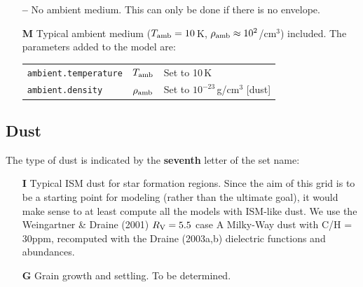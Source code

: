 \documentclass[10pt]{article}
\begin{document}
\begin{itemize}

\item[\textbf{--}] No ambient medium. This can only be done if there is no envelope.

\item[\textbf{M}] Typical ambient medium ($T_{\rm amb}=10$\,K, $\rho_{\rm amb}\approx10^2$/cm$^3$) included. The parameters added to the model are:

\begin{center}
  \begin{tabular}{llp{4in}}
    \texttt{ambient.temperature} & $T_{\rm amb}$ & Set to 10\,K \\
    \texttt{ambient.density} & $\rho_{\rm amb}$ & Set to $10^{-23}$\,g/cm$^3$ [dust] \\
  \end{tabular}
\end{center}

\end{itemize}

\subsection{Dust}

The type of dust is indicated by the \textbf{seventh} letter of the set name:

\begin{itemize}

\item[\textbf{I}] Typical ISM dust for star formation regions. Since the aim of this grid is to be a starting point for modeling (rather than the ultimate goal), it would make sense to at least compute all the models with ISM-like dust. We use the Weingartner \& Draine (2001) $R_{\rm V}=5.5$ case A Milky-Way dust with C/H = 30ppm, recomputed with the Draine (2003a,b) dielectric functions and abundances.


\item[\textbf{G}] Grain growth and settling. To be determined.



\end{itemize}
\end{document}

